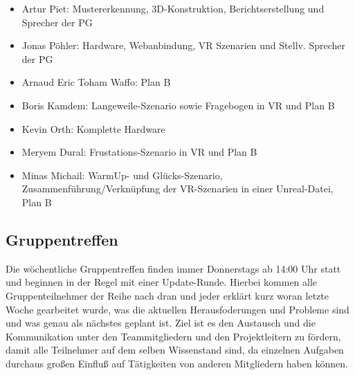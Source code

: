 \begin{itemize} \setlength\itemsep{-0.15cm}
  \item Artur Piet: Mustererkennung, 3D-Konstruktion, Berichtserstellung und Sprecher der PG
  \item Jonas P{\"o}hler: Hardware, Webanbindung, VR Szenarien und Stellv. Sprecher der PG
  \item Arnaud Eric Toham Waffo: Plan B
  \item Boris Kamdem: Langeweile-Szenario sowie Fragebogen in VR und Plan B
  \item Kevin Orth: Komplette Hardware
  \item Meryem Dural: Frustations-Szenario in VR und Plan B
  \item Minas Michail: WarmUp- und Gl{\"u}cks-Szenario, Zusammenführung/Verknüpfung der VR-Szenarien in einer Unreal-Datei, Plan B
\end{itemize}




\subsection{Gruppentreffen}


Die w{\"o}chentliche Gruppentreffen finden immer Donnerstags ab 14:00 Uhr statt und beginnen in der Regel mit einer Update-Runde. Hierbei kommen alle Gruppenteilnehmer der Reihe nach dran und jeder erkl{\"a}rt kurz woran letzte Woche gearbeitet wurde, was die aktuellen Herausfoderungen und Probleme sind und was genau als n{\"a}chstes geplant ist. Ziel ist es den Austausch und die Kommunikation unter den Teammitgliedern und den Projektleitern zu f{\"o}rdern, damit alle Teilnehmer auf dem selben Wissenstand sind, da einzelnen Aufgaben durchaus gro{\ss}en Einflu{\ss} auf T{\"a}tigkeiten von anderen Mitgliedern haben k{\"o}nnen. \\